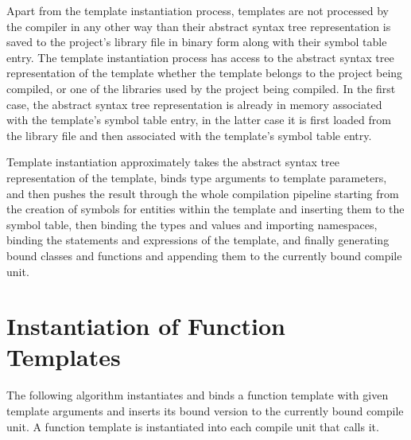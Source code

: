 \documentclass[a4paper,oneside,11pt]{book}
\theoremstyle{definition}
\begin{document}
Apart from the template instantiation process, templates are not processed by the compiler in any other way
than their abstract syntax tree representation is saved to the project's library file in binary form along
with their symbol table entry.
The template instantiation process has access to the abstract syntax tree representation of the template whether
the template belongs to the project being compiled, or one of the libraries used by the project being compiled.
In the first case, the abstract syntax tree representation is already in memory associated with the template's symbol table entry,
in the latter case it is first loaded from the library file and then associated with the template's symbol table entry.

Template instantiation approximately takes the abstract syntax tree representation of the template, binds type arguments to
template parameters, and then pushes the result through the whole compilation pipeline starting from the creation of symbols
for entities within the template and inserting them to the symbol table,
then binding the types and values and importing namespaces, binding the statements and expressions of the template,
and finally generating bound classes and functions and appending them to the currently bound compile unit.

\section{Instantiation of Function Templates}

The following algorithm instantiates and binds a function template with given template arguments and
inserts its bound version to the currently bound compile unit.
A function template is instantiated into each compile unit that calls it.
\end{document}
